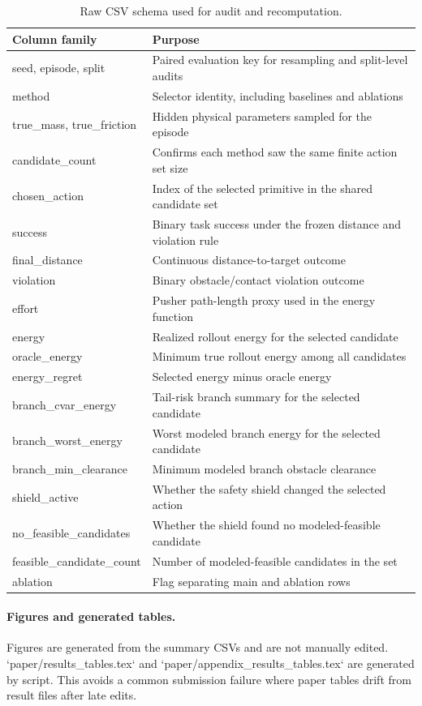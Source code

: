 \documentclass{article}
\begin{document}
\begin{table}[h]
\centering
\caption{Raw CSV schema used for audit and recomputation.}
\label{tab:raw-schema}
\small
\begin{tabular}{ll}
\toprule
Column family & Purpose \\
\midrule
seed, episode, split & Paired evaluation key for resampling and split-level audits \\
method & Selector identity, including baselines and ablations \\
true\_mass, true\_friction & Hidden physical parameters sampled for the episode \\
candidate\_count & Confirms each method saw the same finite action set size \\
chosen\_action & Index of the selected primitive in the shared candidate set \\
success & Binary task success under the frozen distance and violation rule \\
final\_distance & Continuous distance-to-target outcome \\
violation & Binary obstacle/contact violation outcome \\
effort & Pusher path-length proxy used in the energy function \\
energy & Realized rollout energy for the selected candidate \\
oracle\_energy & Minimum true rollout energy among all candidates \\
energy\_regret & Selected energy minus oracle energy \\
branch\_cvar\_energy & Tail-risk branch summary for the selected candidate \\
branch\_worst\_energy & Worst modeled branch energy for the selected candidate \\
branch\_min\_clearance & Minimum modeled branch obstacle clearance \\
shield\_active & Whether the safety shield changed the selected action \\
no\_feasible\_candidates & Whether the shield found no modeled-feasible candidate \\
feasible\_candidate\_count & Number of modeled-feasible candidates in the set \\
ablation & Flag separating main and ablation rows \\
\bottomrule
\end{tabular}
\end{table}

\paragraph{Figures and generated tables.}
Figures are generated from the summary CSVs and are not manually edited.  `paper/results\_tables.tex` and `paper/appendix\_results\_tables.tex` are generated by script.  This avoids a common submission failure where paper tables drift from result files after late edits.
\end{document}
